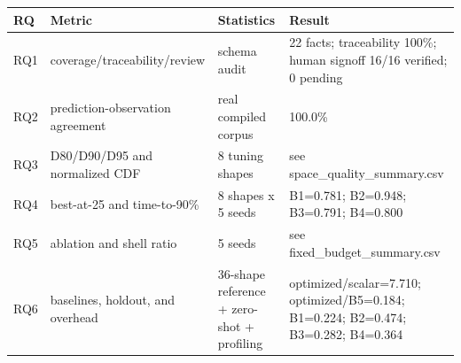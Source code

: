 \begin{tabular}{llll}
\toprule
RQ & Metric & Statistics & Result \\
\midrule
RQ1 & coverage/traceability/review & schema audit & 22 facts; traceability 100\%; human signoff 16/16 verified; 0 pending \\
RQ2 & prediction-observation agreement & real compiled corpus & 100.0\% \\
RQ3 & D80/D90/D95 and normalized CDF & 8 tuning shapes & see space\_quality\_summary.csv \\
RQ4 & best-at-25 and time-to-90\% & 8 shapes x 5 seeds & B1=0.781; B2=0.948; B3=0.791; B4=0.800 \\
RQ5 & ablation and shell ratio & 5 seeds & see fixed\_budget\_summary.csv \\
RQ6 & baselines, holdout, and overhead & 36-shape reference + zero-shot + profiling & optimized/scalar=7.710; optimized/B5=0.184; B1=0.224; B2=0.474; B3=0.282; B4=0.364 \\
\bottomrule
\end{tabular}
